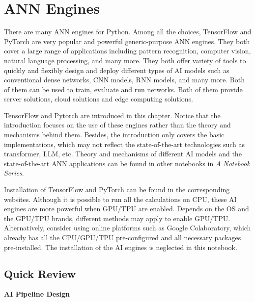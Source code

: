\chapter{ANN Engines} \label{ch:tftorch} 

There are many ANN engines for Python. Among all the choices, TensorFlow and PyTorch are very popular and powerful generic-purpose ANN engines. They both cover a large range of applications including pattern recognition, computer vision, natural language processing, and many more. They both offer variety of tools to quickly and flexibly design and deploy different types of AI models such as conventional dense networks, CNN models, RNN models, and many more. Both of them can be used to train, evaluate and run networks. Both of them provide server solutions, cloud solutions and edge computing solutions.

TensorFlow and Pytorch are introduced in this chapter. Notice that the introduction focuses on the use of these engines rather than the theory and mechanisms behind them. Besides, the introduction only covers the basic implementations, which may not reflect the state-of-the-art technologies such as transformer, LLM, etc. Theory and mechanisms of different AI models and the state-of-the-art ANN applications can be found in other notebooks in \textit{A Notebook Series}.

Installation of TensorFlow and PyTorch can be found in the corresponding websites. Although it is possible to run all the calculations on CPU, these AI engines are more powerful when GPU/TPU are enabled. Depends on the OS and the GPU/TPU brands, different methods may apply to enable GPU/TPU. Alternatively, consider using online platforms such as Google Colaboratory, which already has all the CPU/GPU/TPU pre-configured and all necessary packages pre-installed. The installation of the AI engines is neglected in this notebook.

\section{Quick Review}

\vspace{0.1in}
\noindent \textbf{AI Pipeline Design}
\vspace{0.1in}

